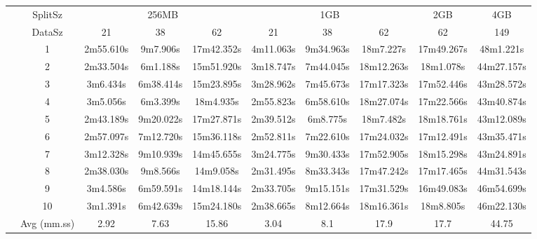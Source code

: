 \begin{tabularx}{\linewidth}{*{10}{c|}}
\cline{2-10}
& SplitSz 
& \multicolumn{3}{c|}{256MB} & \multicolumn{3}{c|}{1GB}  & \multicolumn{1}{c|}{2GB} & \multicolumn{1}{c|}{4GB} \\
\cline{2-10}
& DataSz 
& 21 & 38 & 62 & 21 & 38 & 62 & 62 & 149 \\
\cline{2-10}
& 1
& 2m55.610s & 9m7.906s & 17m42.352s & 4m11.063s & 9m34.963s & 18m7.227s & 17m49.267s & 48m1.221s \\
\cline{2-10}
& 2
& 2m33.504s & 6m1.188s & 15m51.920s & 3m18.747s & 7m44.045s & 18m12.263s & 18m1.078s & 44m27.157s \\
\cline{2-10}
& 3
& 3m6.434s & 6m38.414s & 15m23.895s & 3m28.962s & 7m45.673s & 17m17.323s & 17m52.446s & 43m28.572s \\
\cline{2-10}
& 4
& 3m5.056s & 6m3.399s & 18m4.935s & 2m55.823s & 6m58.610s & 18m27.074s & 17m22.566s & 43m40.874s \\
\cline{2-10}
& 5
& 2m43.189s & 9m20.022s & 17m27.871s & 2m39.512s & 6m8.775s & 18m7.482s & 18m18.761s & 43m12.089s \\
\cline{2-10}
& 6
& 2m57.097s & 7m12.720s & 15m36.118s & 2m52.811s & 7m22.610s & 17m24.032s & 17m12.491s & 43m35.471s \\
\cline{2-10}
& 7
& 3m12.328s & 9m10.939s & 14m45.655s & 3m24.775s & 9m30.433s & 17m52.905s & 18m15.298s & 43m24.891s \\
\cline{2-10}
& 8
& 2m38.030s & 9m8.566s & 14m9.058s & 2m31.495s & 8m33.343s & 17m47.242s & 17m17.465s & 44m31.543s \\
\cline{2-10}
& 9
& 3m4.586s & 6m59.591s & 14m18.144s & 2m33.705s	& 9m15.151s & 17m31.529s & 16m49.083s & 46m54.699s \\
\cline{2-10}
& 10
& 3m1.391s & 6m42.639s & 15m24.180s & 2m38.665s & 8m12.664s & 18m16.361s & 18m8.805s & 46m22.130s \\
\cline{2-10}
& Avg (mm.ss)
& 2.92 & 7.63 & 15.86 & 3.04 & 8.1 & 17.9 & 17.7 & 44.75 \\
\cline{2-10}
\end{tabularx}

